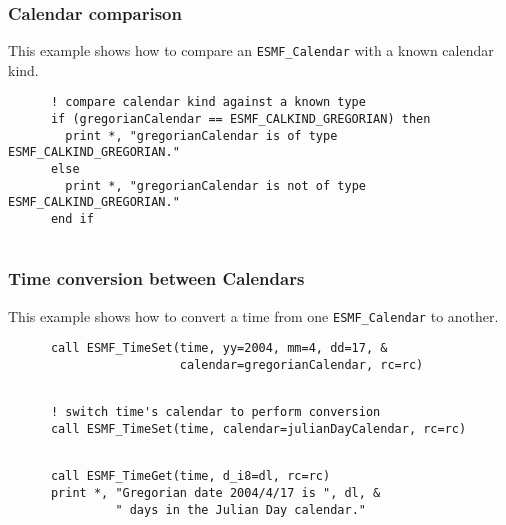 
  \subsubsection{Calendar comparison}
 
   This example shows how to compare an {\tt ESMF\_Calendar} with a known
   calendar kind. 

 \begin{verbatim}
      ! compare calendar kind against a known type
      if (gregorianCalendar == ESMF_CALKIND_GREGORIAN) then
        print *, "gregorianCalendar is of type ESMF_CALKIND_GREGORIAN."
      else
        print *, "gregorianCalendar is not of type ESMF_CALKIND_GREGORIAN."
      end if
 
\end{verbatim}
 

  \subsubsection{Time conversion between Calendars}
 
   This example shows how to convert a time from one {\tt ESMF\_Calendar}
   to another. 

 \begin{verbatim}
      call ESMF_TimeSet(time, yy=2004, mm=4, dd=17, &
                        calendar=gregorianCalendar, rc=rc)
 
\end{verbatim}
 

 \begin{verbatim}
      ! switch time's calendar to perform conversion
      call ESMF_TimeSet(time, calendar=julianDayCalendar, rc=rc)
 
\end{verbatim}
 

 \begin{verbatim}
      call ESMF_TimeGet(time, d_i8=dl, rc=rc)
      print *, "Gregorian date 2004/4/17 is ", dl, &
               " days in the Julian Day calendar."
 
\end{verbatim}
 
